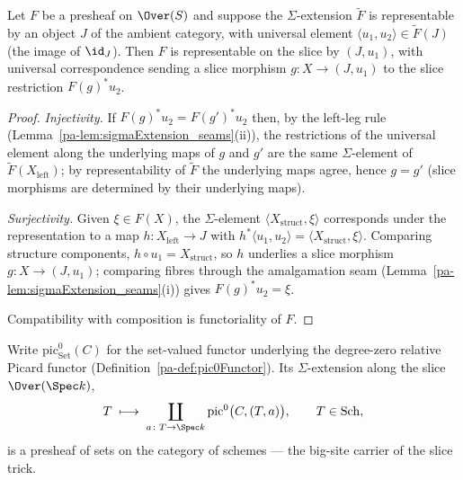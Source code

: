 \begin{theorem}
  \label{pa-thm:representableBy_overSlice}
  \leanok

  Let \(F\) be a presheaf on \(\Over(S)\) and suppose the \(\Sigma\)-extension
  \(\widetilde F\) is representable by an object \(J\) of the ambient category, with
  universal element \(\langle u_1, u_2 \rangle \in \widetilde F(J)\) (the image of
  \(\id_J\)). Then \(F\) is representable on the slice by \((J, u_1)\), with universal
  correspondence sending a slice morphism \(g \colon X \to (J,u_1)\) to the slice
  restriction \(F(g)^{*} u_2\).
\end{theorem}
\begin{proof}
  \leanok
  \emph{Injectivity.} If \(F(g)^{*}u_2 = F(g')^{*}u_2\) then, by the left-leg rule
  (Lemma~\ref{pa-lem:sigmaExtension_seams}(ii)), the restrictions of the universal element
  along the underlying maps of \(g\) and \(g'\) are the same \(\Sigma\)-element of
  \(\widetilde F(X_{\mathrm{left}})\); by representability of \(\widetilde F\) the
  underlying maps agree, hence \(g = g'\) (slice morphisms are determined by their
  underlying maps).

  \emph{Surjectivity.} Given \(\xi \in F(X)\), the \(\Sigma\)-element
  \(\langle X_{\mathrm{struct}}, \xi\rangle\) corresponds under the representation to a map
  \(h \colon X_{\mathrm{left}} \to J\) with
  \(h^{*}\langle u_1, u_2\rangle = \langle X_{\mathrm{struct}}, \xi\rangle\). Comparing
  structure components, \(h \circ u_1 = X_{\mathrm{struct}}\), so \(h\) underlies a slice
  morphism \(g \colon X \to (J, u_1)\); comparing fibres through the amalgamation seam
  (Lemma~\ref{pa-lem:sigmaExtension_seams}(i)) gives \(F(g)^{*}u_2 = \xi\).

  Compatibility with composition is functoriality of \(F\).
\end{proof}

\begin{definition}
  \label{pa-def:pic0SigmaFunctor}
  \leanok

  Write \(\mathrm{pic}^0_{\mathrm{Set}}(C)\) for the set-valued functor underlying the
  degree-zero relative Picard functor (Definition~\ref{pa-def:pic0Functor}). Its
  \(\Sigma\)-extension along the slice \(\Over(\Spec k)\),
  \[
    T \;\longmapsto\; \coprod_{a \colon T \to \Spec k} \mathrm{pic}^0\bigl(C, (T,a)\bigr),
    \qquad T \in \mathrm{Sch},
  \]
  is a presheaf of sets on the category of schemes — the big-site carrier of the slice
  trick.
\end{definition}

